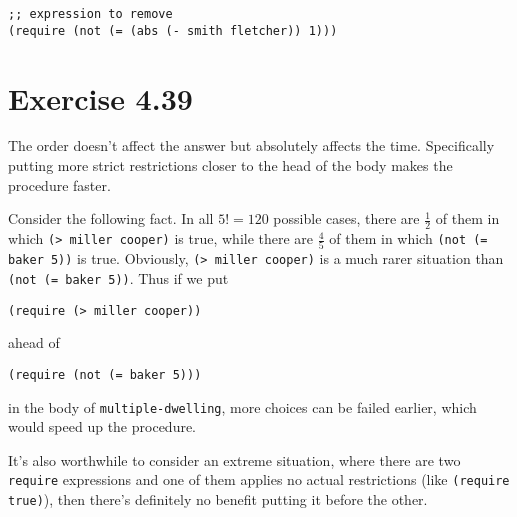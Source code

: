 \documentclass[../main.tex]{subfiles}
\begin{document}
\begin{lstlisting}
;; expression to remove
(require (not (= (abs (- smith fletcher)) 1)))
\end{lstlisting}

\section{Exercise 4.39}

The order doesn't affect the answer but absolutely affects the time. Specifically putting more strict restrictions closer to the head of the body makes the procedure faster.

Consider the following fact. In all $5!=120$ possible cases, there are $\frac{1}{2}$ of them in which \lstinline{(> miller cooper)} is true, while there are $\frac{4}{5}$ of them in which \lstinline{(not (= baker 5))} is true. Obviously, \lstinline{(> miller cooper)} is a much rarer situation than \lstinline{(not (= baker 5))}. Thus if we put

\begin{lstlisting}
(require (> miller cooper))
\end{lstlisting}

ahead of

\begin{lstlisting}
(require (not (= baker 5)))
\end{lstlisting}

in the body of \lstinline{multiple-dwelling}, more choices can be failed earlier, which would speed up the procedure.

It's also worthwhile to consider an extreme situation, where there are two \lstinline{require} expressions and one of them applies no actual restrictions (like \lstinline{(require true)}), then there's definitely no benefit putting it before the other.
\end{document}
